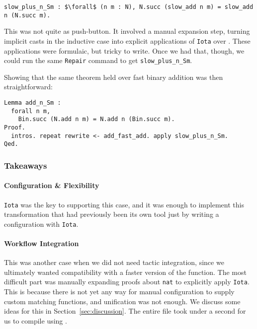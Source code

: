 \begin{lstlisting}
slow_plus_n_Sm : $\forall$ (n m : N), N.succ (slow_add n m) = slow_add n (N.succ m).
\end{lstlisting}
This was not quite as push-button.
It involved a manual expansion step, turning implicit casts in the inductive case
into explicit applications of \lstinline{Iota} over \A.
These applications were formulaic, but tricky to write.
Once we had that, though, we could run the same \lstinline{Repair} command
to get \lstinline{slow_plus_n_Sm}.

Showing that the same theorem held over fast binary addition was then
straightforward:

\begin{lstlisting}
Lemma add_n_Sm :
  forall n m,
    Bin.succ (N.add n m) = N.add n (Bin.succ m).
Proof.
  intros. repeat rewrite <- add_fast_add. apply slow_plus_n_Sm.
Qed.
\end{lstlisting}

\subsubsection{Takeaways}

\paragraph{Configuration \& Flexibility}
\lstinline{Iota} was the key to supporting this case,
and it was enough to implement this transformation that had previously been its own tool
just by writing a configuration with \lstinline{Iota}. 

\paragraph{Workflow Integration}
This was another case when we did not need tactic integration, since we
ultimately wanted compatibility with a faster version of the function.
The most difficult part was manually expanding proofs about \lstinline{nat}
to explicitly apply \lstinline{Iota}.
This is because there is not yet any way for manual configuration to supply custom matching functions,
and unification was not enough.
We discuss some ideas for this in Section~\ref{sec:discussion}. %
The entire file took under a second for us to compile using \toolname.



